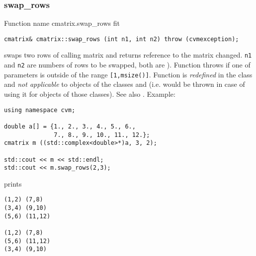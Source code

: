 \subsubsection{swap\_rows}
Function%
\pdfdest name {cmatrix.swap_rows} fit
\begin{verbatim}
cmatrix& cmatrix::swap_rows (int n1, int n2) throw (cvmexception);
\end{verbatim}
swaps two rows of  calling matrix and returns  reference to
the matrix changed. \verb"n1" and \verb"n2" are
numbers of rows to be swapped, 
both are \Based).
Function throws  
if one of  parameters is outside of the range
\verb"[1,msize()]".
Function is \emph{redefined} in the class
 and
\emph{not applicable} to objects of the classes
 and
 (i.e. 
 would be thrown
in case of using it for objects of those classes).
See also .
Example:
\begin{Verbatim}
using namespace cvm;

double a[] = {1., 2., 3., 4., 5., 6.,
              7., 8., 9., 10., 11., 12.};
cmatrix m ((std::complex<double>*)a, 3, 2);

std::cout << m << std::endl;
std::cout << m.swap_rows(2,3);
\end{Verbatim}
prints
\begin{Verbatim}
(1,2) (7,8)
(3,4) (9,10)
(5,6) (11,12)

(1,2) (7,8)
(5,6) (11,12)
(3,4) (9,10)
\end{Verbatim}
\newpage



